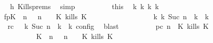 \begin{isabellebody}
\ \ \ \ \ \ \ \ \ \ \isamarkupfalse%
\ h{}\ Kills{\isachardot}prems\ \isamarkupfalse%
\ simp\isanewline
\ \ \ \ \ \ \ \ \isamarkupfalse%
\ this\ \isamarkupfalse%
\ {\isasymGamma}\isactrlsub k\ {\isasymPsi}\isactrlsub k\ {\isasymPhi}\isactrlsub k\ k\ \isanewline
\ \ \ \ \ \ \ \ \ \ fp{\isacharcolon}{\isacartoucheopen}{\isacharparenleft}{\isacharparenleft}{\isacharparenleft}{\isacharparenleft}K\ {\isasymnot}{\isasymUp}\ n{\isacharparenright}\ {\isacharhash}\ {\isasymGamma}{\isacharparenright}{\isacharcomma}\ n\ {\isasymturnstile}\ {\isasymPsi}\ {\isasymtriangleright}\ {\isacharparenleft}{\isacharparenleft}K\ kills\ K\ {\isacharhash}\ {\isasymPhi}{\isacharparenright}{\isacharparenright}\isanewline
\ \ \ \ \ \ \ \ \ \ \ \ \ \ \ \ {\isasymhookrightarrow}\isactrlbsup k\isactrlesup \ {\isacharparenleft}{\isasymGamma}\isactrlsub k{\isacharcomma}\ Suc\ n\ {\isasymturnstile}\ {\isasymPsi}\isactrlsub k\ {\isasymtriangleright}\ {\isasymPhi}\isactrlsub k{\isacharparenright}{\isacharparenright}{\isacartoucheclose}\isanewline
\ \ \ \ \ \ \ \ \ \ \ rc{\isacharcolon}{\isacartoucheopen}{\isasymrho}\ {\isasymin}\ {\isasymlbrakk}\ {\isasymGamma}\isactrlsub k{\isacharcomma}\ Suc\ n\ {\isasymturnstile}\ {\isasymPsi}\isactrlsub k\ {\isasymtriangleright}\ {\isasymPhi}\isactrlsub k\ {\isasymrbrakk}\isactrlsub c\isactrlsub o\isactrlsub n\isactrlsub f\isactrlsub i\isactrlsub g{\isacartoucheclose}\ \isamarkupfalse%
\ blast\isanewline
\ \ \ \ \ \ \ \ \isamarkupfalse%
\ pc{\isacharcolon}{\isacartoucheopen}{\isacharparenleft}{\isasymGamma}{\isacharcomma}\ n\ {\isasymturnstile}\ {\isacharparenleft}K\ kills\ K\ {\isacharhash}\ {\isasymPsi}\ {\isasymtriangleright}\ {\isasymPhi}{\isacharparenright}\isanewline
\ \ \ \ \ \ \ \ \ \ \ \ \ \ \ \ \ \ {\isasymhookrightarrow}\ {\isacharparenleft}{\isacharparenleft}{\isacharparenleft}K\ {\isasymnot}{\isasymUp}\ n{\isacharparenright}\ {\isacharhash}\ {\isasymGamma}{\isacharparenright}{\isacharcomma}\ n\ {\isasymturnstile}\ {\isasymPsi}\ {\isasymtriangleright}\ {\isacharparenleft}{\isacharparenleft}K\ kills\ K\ {\isacharhash}\ {\isasymPhi}{\isacharparenright}{\isacharparenright}{\isacartoucheclose}\isanewline
\ \ \ \ \ \ \ \ \ \ \isamarkupfalse%

\end{isabellebody}
